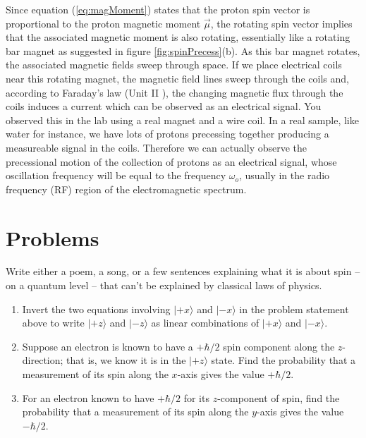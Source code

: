 Since equation (\ref{eq:magMoment}) states that the proton spin vector is proportional to the proton magnetic moment $\vec{\mu}$, the rotating spin vector implies that the associated magnetic moment is also rotating, essentially like a rotating bar magnet as suggested in figure \ref{fig:spinPrecess}(b).  As this bar magnet rotates, the associated magnetic fields sweep through space.  If we place electrical coils near this rotating magnet, the magnetic field lines sweep through the coils and, according to Faraday's law (Unit II ), the changing magnetic flux through the coils induces a current which can be observed as an electrical signal.  You observed this in the lab using a real magnet and a wire coil. In a real sample, like water for instance, we have lots of protons precessing together producing a measureable signal in the coils. Therefore we can actually observe the precessional motion of the collection of protons as an electrical signal, whose oscillation frequency will be equal to the frequency $\omega_o$, usually in the radio frequency (RF) region of the electromagnetic spectrum. 




\newpage

\section*{Problems}

\begin{problem}
Write either a poem, a song, or a few sentences explaining
what it is about spin -- on a quantum level -- that can't be
explained by classical laws of physics. \label{prob:spin_poem}
\end{problem}


\begin{problem}
  \begin{enumerate} 
  \item Invert the two equations involving $|\mbox{$+x$}\rangle$ and
    $|\mbox{$-x$}\rangle$ in the problem statement above to write $|\mbox{$+z$}\rangle$
    and $|\mbox{$-z$}\rangle$ as linear combinations of $|\mbox{$+x$}\rangle$ and
    $|\mbox{$-x$}\rangle$.\label{problem:z_in_terms_of_x}
  \item Suppose an electron is known to have a $+\hbar/2$ spin
    component along the $z$-direction; that is, we know it is in the
    $|\mbox{$+z$}\rangle$ state.  Find the probability that a measurement of
    its spin along the $x$-axis gives the value $+\hbar/2$.
  \item For an electron known to have $+\hbar/2$ for its $z$-component
    of spin, find the probability that a measurement of its spin along
    the $y$-axis gives the value $-\hbar/2$.
  \end{enumerate}
\label{prob:spin_i}
\end{problem}


